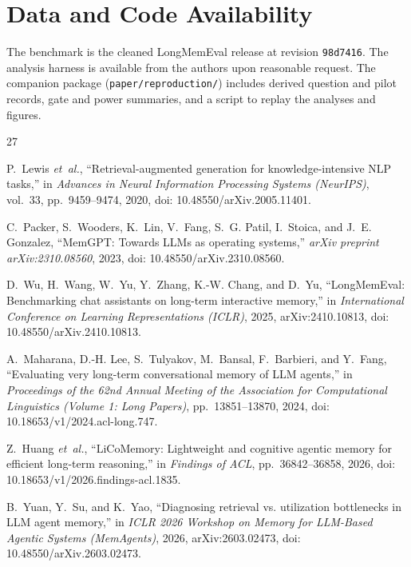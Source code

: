 \section*{Data and Code Availability}
The benchmark is the cleaned LongMemEval release at revision \texttt{98d7416}. The analysis harness is available from the authors upon reasonable request. The companion package (\texttt{paper/reproduction/}) includes derived question and pilot records, gate and power summaries, and a script to replay the analyses and figures.

\newpage
\begin{thebibliography}{27}
\scriptsize

P.~Lewis \emph{et~al.}, ``Retrieval-augmented generation for knowledge-intensive NLP tasks,'' in \emph{Advances in Neural Information Processing Systems (NeurIPS)}, vol.~33, pp.~9459--9474, 2020, doi: 10.48550/arXiv.2005.11401.

C.~Packer, S.~Wooders, K.~Lin, V.~Fang, S.~G. Patil, I.~Stoica, and J.~E. Gonzalez, ``MemGPT: Towards LLMs as operating systems,'' \emph{arXiv preprint arXiv:2310.08560}, 2023, doi: 10.48550/arXiv.2310.08560.

D.~Wu, H.~Wang, W.~Yu, Y.~Zhang, K.-W. Chang, and D.~Yu, ``LongMemEval: Benchmarking chat assistants on long-term interactive memory,'' in \emph{International Conference on Learning Representations (ICLR)}, 2025, arXiv:2410.10813, doi: 10.48550/arXiv.2410.10813.

A.~Maharana, D.-H. Lee, S.~Tulyakov, M.~Bansal, F.~Barbieri, and Y.~Fang, ``Evaluating very long-term conversational memory of LLM agents,'' in \emph{Proceedings of the 62nd Annual Meeting of the Association for Computational Linguistics (Volume 1: Long Papers)}, pp.~13851--13870, 2024, doi: 10.18653/v1/2024.acl-long.747.

Z.~Huang \emph{et~al.}, ``LiCoMemory: Lightweight and cognitive agentic memory for efficient long-term reasoning,'' in \emph{Findings of ACL}, pp.~36842--36858, 2026, doi: 10.18653/v1/2026.findings-acl.1835.

B.~Yuan, Y.~Su, and K.~Yao, ``Diagnosing retrieval vs. utilization bottlenecks in LLM agent memory,'' in \emph{ICLR 2026 Workshop on Memory for LLM-Based Agentic Systems (MemAgents)}, 2026, arXiv:2603.02473, doi: 10.48550/arXiv.2603.02473.


\end{thebibliography}
